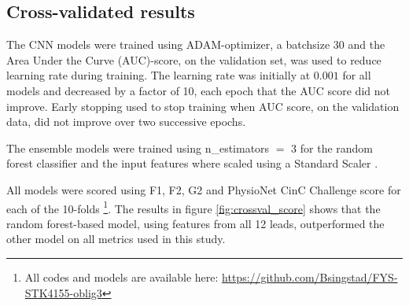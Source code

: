 \subsection{Cross-validated results}
The CNN models were trained using ADAM-optimizer, a batchsize $30$ and the Area Under the Curve (AUC)-score, on the validation set, was used to reduce learning rate during training. The learning rate was initially at $0.001$ for all models and decreased by a factor of 10, each epoch that the AUC score did not improve. Early stopping used to stop training when AUC score, on the validation data, did not improve over two successive epochs.

The ensemble models were trained using n\_estimators $=$ 3 for the random forest classifier and the input features where scaled using a Standard Scaler \cite{pedregosa_scikit-learn_2011}.

All models were scored using F1, F2, G2 and PhysioNet CinC Challenge score for each of the 10-folds \footnote{All codes and models are available here: \url{https://github.com/Bsingstad/FYS-STK4155-oblig3}}. The results in figure \ref{fig:crossval_score} shows that the random forest-based model, using features from all 12 leads, outperformed the other model on all metrics used in this study. 



